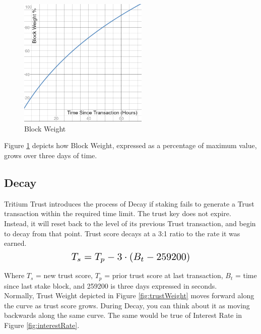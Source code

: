 \documentclass[11pt]{article}
\begin{document}
\begin{figure}[h!]
    \centering
    \includegraphics[width=0.55\textwidth]{images/blockWeight.png}
    \caption{Block Weight \label{fig:blockWeight}}
\end{figure}

\noindent Figure \ref{fig:blockWeight} depicts how Block Weight, expressed as a percentage of maximum value, grows over three days of time.\\

\subsection{Decay}
Tritium Trust introduces the process of Decay if staking fails to generate a Trust transaction within the required time limit. The trust key does not expire. Instead, it will reset back to the level of its previous Trust transaction, and begin to decay from that point. Trust score decays at a 3:1 ratio to the rate it was earned.\\
\begin{equation}
\resizebox{.50\hsize}{!}{$T_s = T_p - 3 \cdot (B_t - 259200)$}
\end{equation}

\noindent Where $T_s$ = new trust score, $T_p$ = prior trust score at last transaction, $B_t$ = time since last stake block, and 259200 is three days expressed in seconds.\\

\noindent Normally, Trust Weight depicted in Figure \ref{fig:trustWeight} moves forward along the curve as trust score grows. During Decay, you can think about it as moving backwards along the same curve. The same would be true of Interest Rate in Figure \ref{fig:interestRate}. \\
\end{document}

